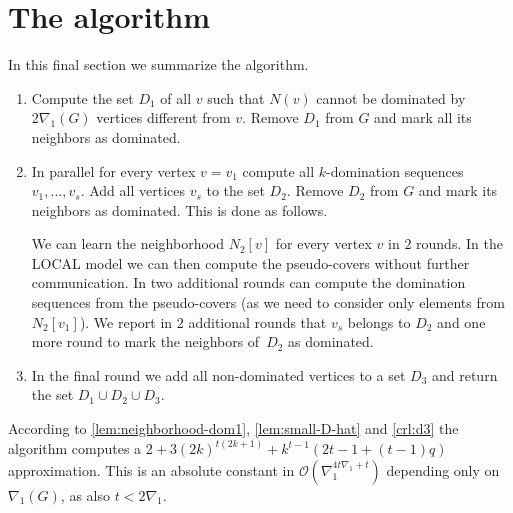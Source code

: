 \section{The algorithm}

In this final section we summarize the algorithm.

\begin{enumerate}
\item Compute the set $D_1$ of all $v$ such that $N(v)$ cannot be
dominated by $2\nabla_1(G)$ vertices different from $v$.
Remove $D_1$ from $G$ and mark all its neighbors as dominated.
\item In parallel for every vertex $v=v_1$ compute all $k$-domination
sequences $v_1,\ldots, v_s$. Add all vertices $v_s$ to the set
$D_2$. Remove $D_2$ from $G$ and mark its neighbors as
dominated. This is done as follows.

We can learn the
neighborhood $N_2[v]$ for every vertex $v$ in $2$ rounds.
In the LOCAL model we can then compute the pseudo-covers
without further communication. In two additional rounds can
compute the domination sequences from the pseudo-covers
(as we need to consider only elements from $N_2[v_1]$).
We report in $2$ additional rounds that $v_s$ belongs to $D_2$
and one more round to mark the neighbors of~$D_2$ as
dominated.
\item In the final round we add all non-dominated vertices to a set $D_3$
and return the set $D_1\cup D_2\cup D_3$.
\end{enumerate}

According to \cref{lem:neighborhood-dom1},
\cref{lem:small-D-hat}
  and \cref{crl:d3}
  the algorithm computes a $2+  3(2k)^{t(2k+1)}+k^{t-1}(2t-1+(t-1)q)$
  approximation. This is an absolute constant in
  $\mathcal{O}(\nabla_1^{4t\nabla_1+t})$ depending only on $\nabla_1(G)$,
  as also $t<2\nabla_1$.
